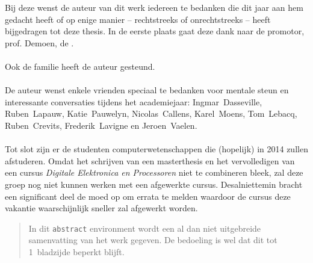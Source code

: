 \documentclass[draft,master=cws,masteroption=ai]{kulemt}
\begin{document}
\begin{preface}
  Bij deze wenst de auteur van dit werk iedereen te bedanken die dit jaar aan hem gedacht heeft of op enige manier -- rechtstreeks of onrechtstreeks -- heeft bijgedragen tot deze thesis. In de eerste plaats gaat deze dank naar de promotor, prof. Demoen, de .
  \paragraph{}
  Ook de familie heeft de auteur gesteund.%
  \paragraph{}
  De auteur wenst enkele vrienden speciaal te bedanken voor mentale steun en interessante conversaties tijdens het academiejaar: \nohyphens{Ingmar~Dasseville}, \nohyphens{Ruben~Lapauw}, \nohyphens{Katie~Pauwelyn}, \nohyphens{Nicolas~Callens}, \nohyphens{Karel~Moens}, \nohyphens{Tom~Lebacq}, \nohyphens{Ruben~Crevits}, \nohyphens{Frederik~Lavigne} en \nohyphens{Jeroen~Vaelen}.
  \paragraph{}
  Tot slot zijn er de studenten computerwetenschappen die (hopelijk) in 2014 zullen afstuderen. Omdat het schrijven van een masterthesis en het vervolledigen van een cursus \emph{Digitale Elektronica en Processoren} niet te combineren bleek, zal deze groep nog niet kunnen werken met een afgewerkte cursus. Desalniettemin bracht een significant deel de moed op om errata te melden waardoor de cursus deze vakantie waarschijnlijk sneller zal afgewerkt worden.
\end{preface}

\tableofcontents*

\begin{abstract}
  In dit \texttt{abstract} environment wordt een al dan niet uitgebreide
  samenvatting van het werk gegeven. De bedoeling is wel dat dit tot
  1~bladzijde beperkt blijft.

\end{abstract}
\end{document}
